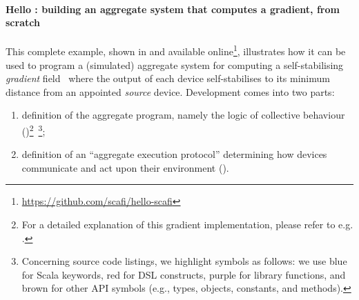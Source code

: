 \paragraph{Hello \scafi{}: building an aggregate system that computes a gradient, from scratch}
This complete example, shown in  and available online\footnote{\url{https://github.com/scafi/hello-scafi}}, illustrates how it \scafi{} can be used
 to program a (simulated) aggregate system
 for computing a self-stabilising \emph{gradient} field~\cite{DBLP:conf/sac/BealBVT08,DBLP:journals/tomacs/ViroliABDP18}
 where the output of each device self-stabilises to
 its minimum distance from an appointed \emph{source} device.
%
Development comes into two parts:
\begin{enumerate}
  \item definition of the aggregate program,
  namely the logic of collective behaviour ()\footnote{For a detailed explanation of this gradient implementation, please refer to e.g. \cite{DBLP:journals/eaai/CasadeiVAPD21}.}~\footnote{Concerning source code listings, we highlight symbols as follows: we use blue for Scala keywords, red for \scafi{} DSL constructs, purple for \scafi{} library functions, and brown for other \scafi{} API symbols (e.g., types, objects, constants, and methods).};
  \item definition of an ``aggregate execution protocol''
  determining how devices communicate and act upon their environment ().
\end{enumerate}

